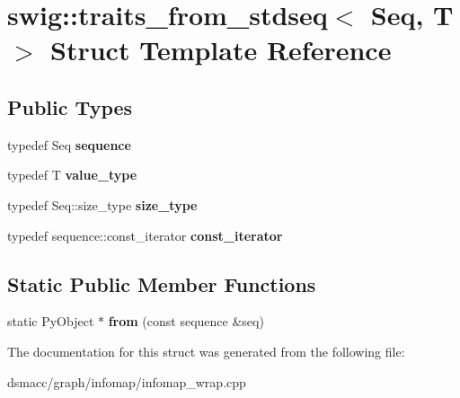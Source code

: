 \hypertarget{structswig_1_1traits__from__stdseq}{}\section{swig\+:\+:traits\+\_\+from\+\_\+stdseq$<$ Seq, T $>$ Struct Template Reference}
\label{structswig_1_1traits__from__stdseq}
\subsection*{Public Types}
\begin{DoxyCompactItemize}
\item 
\mbox{\label{structswig_1_1traits__from__stdseq_ad784f89c80055794b0da097a644ab7ab}} 
typedef Seq {\bfseries sequence}
\item 
\mbox{\label{structswig_1_1traits__from__stdseq_a2159701c1eaadbf75d9b3014fea48706}} 
typedef T {\bfseries value\+\_\+type}
\item 
\mbox{\label{structswig_1_1traits__from__stdseq_a1189d4a7cea9e522a7c10ed7ff2ce232}} 
typedef Seq\+::size\+\_\+type {\bfseries size\+\_\+type}
\item 
\mbox{\label{structswig_1_1traits__from__stdseq_ab1c085e18d48f5f0afe549b4dc885290}} 
typedef sequence\+::const\+\_\+iterator {\bfseries const\+\_\+iterator}
\end{DoxyCompactItemize}
\subsection*{Static Public Member Functions}
\begin{DoxyCompactItemize}
\item 
\mbox{\label{structswig_1_1traits__from__stdseq_ab65e9ff3dbb76a137536483c6121584b}} 
static Py\+Object $\ast$ {\bfseries from} (const sequence \&seq)
\end{DoxyCompactItemize}


The documentation for this struct was generated from the following file\+:\begin{DoxyCompactItemize}
\item 
dsmacc/graph/infomap/infomap\+\_\+wrap.\+cpp\end{DoxyCompactItemize}
